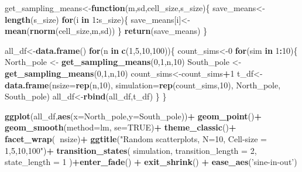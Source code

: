 \documentclass[
]{book}
\newenvironment{Shaded}{\begin{snugshade}}{\end{snugshade}}
\newcommand{\ControlFlowTok}[1]{\textcolor[rgb]{0.13,0.29,0.53}{\textbf{#1}}}
\newcommand{\DataTypeTok}[1]{\textcolor[rgb]{0.13,0.29,0.53}{#1}}
\newcommand{\DecValTok}[1]{\textcolor[rgb]{0.00,0.00,0.81}{#1}}
\newcommand{\KeywordTok}[1]{\textcolor[rgb]{0.13,0.29,0.53}{\textbf{#1}}}
\newcommand{\NormalTok}[1]{#1}
\newcommand{\OperatorTok}[1]{\textcolor[rgb]{0.81,0.36,0.00}{\textbf{#1}}}
\newcommand{\OtherTok}[1]{\textcolor[rgb]{0.56,0.35,0.01}{#1}}
\newcommand{\StringTok}[1]{\textcolor[rgb]{0.31,0.60,0.02}{#1}}
\begin{document}
\begin{Shaded}
\begin{Highlighting}[]
\NormalTok{get_sampling_means<-}\ControlFlowTok{function}\NormalTok{(m,sd,cell_size,s_size)\{}
\NormalTok{  save_means<-}\KeywordTok{length}\NormalTok{(s_size)}
  \ControlFlowTok{for}\NormalTok{(i }\ControlFlowTok{in} \DecValTok{1}\OperatorTok{:}\NormalTok{s_size)\{}
\NormalTok{    save_means[i]<-}\KeywordTok{mean}\NormalTok{(}\KeywordTok{rnorm}\NormalTok{(cell_size,m,sd))}
\NormalTok{  \}}
  \KeywordTok{return}\NormalTok{(save_means)}
\NormalTok{\}}

\NormalTok{all_df<-}\KeywordTok{data.frame}\NormalTok{()}
\ControlFlowTok{for}\NormalTok{(n }\ControlFlowTok{in} \KeywordTok{c}\NormalTok{(}\DecValTok{1}\NormalTok{,}\DecValTok{5}\NormalTok{,}\DecValTok{10}\NormalTok{,}\DecValTok{100}\NormalTok{))\{}
\NormalTok{  count_sims<-}\DecValTok{0}
  \ControlFlowTok{for}\NormalTok{(sim }\ControlFlowTok{in} \DecValTok{1}\OperatorTok{:}\DecValTok{10}\NormalTok{)\{}
\NormalTok{    North_pole <-}\StringTok{ }\KeywordTok{get_sampling_means}\NormalTok{(}\DecValTok{0}\NormalTok{,}\DecValTok{1}\NormalTok{,n,}\DecValTok{10}\NormalTok{)}
\NormalTok{    South_pole <-}\StringTok{ }\KeywordTok{get_sampling_means}\NormalTok{(}\DecValTok{0}\NormalTok{,}\DecValTok{1}\NormalTok{,n,}\DecValTok{10}\NormalTok{)}
\NormalTok{      count_sims<-count_sims}\OperatorTok{+}\DecValTok{1}
\NormalTok{      t_df<-}\KeywordTok{data.frame}\NormalTok{(}\DataTypeTok{nsize=}\KeywordTok{rep}\NormalTok{(n,}\DecValTok{10}\NormalTok{),}
                       \DataTypeTok{simulation=}\KeywordTok{rep}\NormalTok{(count_sims,}\DecValTok{10}\NormalTok{),}
\NormalTok{                       North_pole,}
\NormalTok{                       South_pole)}
\NormalTok{      all_df<-}\KeywordTok{rbind}\NormalTok{(all_df,t_df)}
\NormalTok{  \}}
\NormalTok{\}}


\KeywordTok{ggplot}\NormalTok{(all_df,}\KeywordTok{aes}\NormalTok{(}\DataTypeTok{x=}\NormalTok{North_pole,}\DataTypeTok{y=}\NormalTok{South_pole))}\OperatorTok{+}
\StringTok{  }\KeywordTok{geom_point}\NormalTok{()}\OperatorTok{+}
\StringTok{  }\KeywordTok{geom_smooth}\NormalTok{(}\DataTypeTok{method=}\NormalTok{lm, }\DataTypeTok{se=}\OtherTok{TRUE}\NormalTok{)}\OperatorTok{+}
\StringTok{  }\KeywordTok{theme_classic}\NormalTok{()}\OperatorTok{+}
\StringTok{  }\KeywordTok{facet_wrap}\NormalTok{(}\OperatorTok{~}\NormalTok{nsize)}\OperatorTok{+}
\StringTok{  }\KeywordTok{ggtitle}\NormalTok{(}\StringTok{"Random scatterplots, N=10, Cell-size = 1,5,10,100"}\NormalTok{)}\OperatorTok{+}
\StringTok{  }\KeywordTok{transition_states}\NormalTok{(}
\NormalTok{    simulation,}
    \DataTypeTok{transition_length =} \DecValTok{2}\NormalTok{,}
    \DataTypeTok{state_length =} \DecValTok{1}
\NormalTok{  )}\OperatorTok{+}\KeywordTok{enter_fade}\NormalTok{() }\OperatorTok{+}\StringTok{ }
\StringTok{  }\KeywordTok{exit_shrink}\NormalTok{() }\OperatorTok{+}
\StringTok{  }\KeywordTok{ease_aes}\NormalTok{(}\StringTok{'sine-in-out'}\NormalTok{)}
\end{Highlighting}
\end{Shaded}
\end{document}
